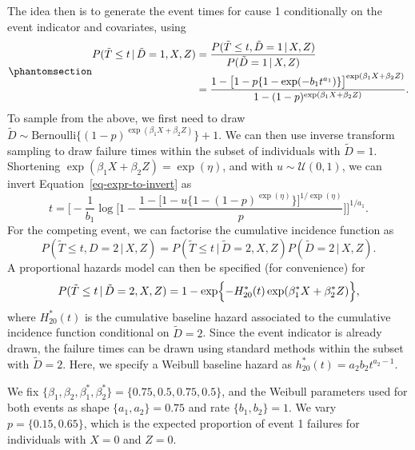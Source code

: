 \documentclass[
  letterpaper,
  DIV=11,
  numbers=noendperiod]{scrreprt}
\newcommand{\given}{\,|\,}
\begin{document}
The idea then is to generate the event times for cause 1 conditionally
on the event indicator and covariates, using
\begin{equation}\phantomsection\label{eq-expr-to-invert}{
\begin{aligned}
    P(\tilde{T} \leq t \given \tilde{D}=1, X, Z) &= \frac{P(\tilde{T} \leq t, \tilde{D}=1 \given X, Z)}{P(\tilde{D} = 1 \given X, Z)} \\
    &= \frac{1 - \big[1-p\{1- \exp(-b_1t^{a_1})\}\big]^{\exp(\beta_{1}X + \beta_{2}Z)}}{1 - (1-p)^{\exp(\beta_{1}X + \beta_{2}Z)}}. 
\end{aligned}
}\end{equation} To sample from the above, we first need to draw
\(\tilde{D} \sim \text{Bernoulli}\{(1-p)^{\exp(\beta_{1}X + \beta_{2}Z)}\} + 1\).
We can then use inverse transform sampling to draw failure times within
the subset of individuals with \(\tilde{D} = 1\). Shortening
\(\exp(\beta_{1}X + \beta_{2}Z) = \exp(\eta)\), and with
\(u \sim \mathcal{U}(0,1)\), we can invert
Equation~\ref{eq-expr-to-invert} as \begin{equation*}
    t = \Biggl[- \frac{1}{b_1}\log\Bigg[1 - \frac{1-\big[ 1 - u\{1 - (1-p)^{\exp(\eta)}\} \big]^{1/\exp(\eta)}}{p} \Bigg]\Biggr]^{1/{a_1}}.
\end{equation*} For the competing event, we can factorise the cumulative
incidence function as \begin{equation*}
    P(\tilde{T} \leq t, D=2 \given X, Z) = P(\tilde{T} \leq t \given \tilde{D}=2,  X, Z)P(\tilde{D}=2 \given X, Z).
\end{equation*} A proportional hazards model can then be specified (for
convenience) for \begin{equation*}
    P(\tilde{T} \leq t \given \tilde{D}=2,  X, Z) = 1 - \exp\Bigl\{-H_{20}^*(t)\exp(\beta_{1}^*X + \beta_{2}^*Z) \Bigr\},
\end{equation*} where \(H_{20}^*(t)\) is the cumulative baseline hazard
associated to the cumulative incidence function conditional on
\(\tilde{D} = 2\). Since the event indicator is already drawn, the
failure times can be drawn using standard methods within the subset with
\(\tilde{D} = 2\). Here, we specify a Weibull baseline hazard as
\(h_{20}^*(t) = a_2b_2t^{a_2 - 1}\).

We fix
\(\{\beta_{1}, \beta_{2},\beta_{1}^*,\beta_{2}^*\} = \{0.75, 0.5, 0.75, 0.5\}\),
and the Weibull parameters used for both events as shape
\(\{a_1,a_2\} = 0.75\) and rate \(\{b_1,b_2\} = 1\). We vary
\(p = \{0.15, 0.65\}\), which is the expected proportion of event 1
failures for individuals with \(X = 0\) and \(Z = 0\).
\end{document}
